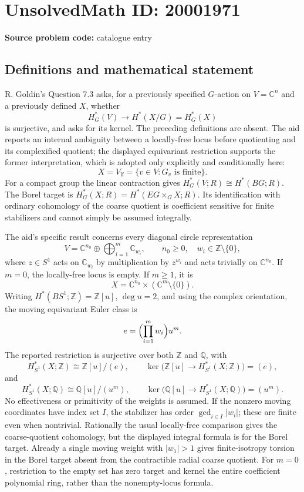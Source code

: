 \documentclass[11pt]{article}
\newcommand{\Z}{\mathbb{Z}}
\newcommand{\Q}{\mathbb{Q}}
\newcommand{\C}{\mathbb{C}}
\begin{document}
\section*{UnsolvedMath ID: 20001971}
\textbf{Source problem code:} catalogue entry
\subsection{Definitions and mathematical statement}
R. Goldin's Question 7.3 asks, for a previously specified \(G\)-action on \(V=\C^n\) and a previously defined \(X\), whether
\[
 H_G^*(V)\longrightarrow H^*(X/G)=H_G^*(X)
\]
is surjective, and asks for its kernel. The preceding definitions are absent. The aid reports an internal ambiguity between a locally-free locus before quotienting and its complexified quotient; the displayed equivariant restriction supports the former interpretation, which is adopted only explicitly and conditionally here:
\[
 X=V_{\mathrm{lf}}=\{v\in V:G_v\text{ is finite}\}.
\]
For a compact group the linear contraction gives \(H_G^*(V;R)\cong H^*(BG;R)\). The Borel target is \(H_G^*(X;R)=H^*(EG\times_GX;R)\). Its identification with ordinary cohomology of the coarse quotient is coefficient sensitive for finite stabilizers and cannot simply be assumed integrally.

The aid's specific result concerns every diagonal circle representation
\[
 V=\C^{n_0}\oplus\bigoplus_{i=1}^m\C_{w_i},\qquad
 n_0\ge0,\quad w_i\in\Z\setminus\{0\},
\]
where \(z\in S^1\) acts on \(\C_{w_i}\) by multiplication by \(z^{w_i}\) and acts trivially on \(\C^{n_0}\). If \(m=0\), the locally-free locus is empty. If \(m\ge1\), it is
\[
 X=\C^{n_0}\times(\C^m\setminus\{0\}).
\]
Writing \(H^*(BS^1;\Z)=\Z[u]\), \(\deg u=2\), and using the complex orientation, the moving equivariant Euler class is
\[
 e=\Bigl(\prod_{i=1}^m w_i\Bigr)u^m.
\]
The reported restriction is surjective over both \(\Z\) and \(\Q\), with
\[
 H_{S^1}^*(X;\Z)\cong\Z[u]/(e),\qquad
 \ker\bigl(\Z[u]\to H_{S^1}^*(X;\Z)\bigr)=(e),
\]
and
\[
 H_{S^1}^*(X;\Q)\cong\Q[u]/(u^m),\qquad
 \ker\bigl(\Q[u]\to H_{S^1}^*(X;\Q)\bigr)=(u^m).
\]
No effectiveness or primitivity of the weights is assumed. If the nonzero moving coordinates have index set \(I\), the stabilizer has order \(\gcd_{i\in I}|w_i|\); these are finite even when nontrivial. Rationally the usual locally-free comparison gives the coarse-quotient cohomology, but the displayed integral formula is for the Borel target. Already a single moving weight with \(|w_1|>1\) gives finite-isotropy torsion in the Borel target absent from the contractible radial coarse quotient. For \(m=0\), restriction to the empty set has zero target and kernel the entire coefficient polynomial ring, rather than the nonempty-locus formula.
\end{document}
